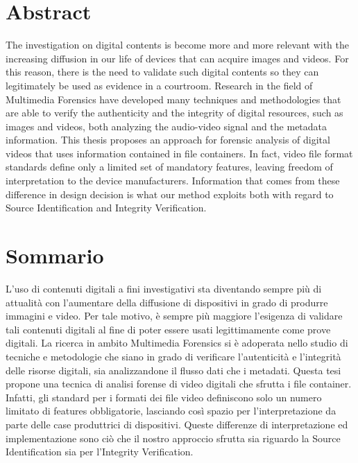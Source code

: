 \chapter*{Abstract}

The investigation on digital contents is become more and more relevant with the increasing diffusion in our life of devices that can acquire images and videos. For this reason, there is the need to validate such digital contents so they can legitimately be used as evidence in a courtroom.
Research in the field of Multimedia Forensics have developed many techniques and methodologies that are able to verify the authenticity and the integrity of digital resources, such as images and videos, both analyzing the audio-video signal and the metadata information.
This thesis proposes an approach for forensic analysis of digital videos that uses information contained in file containers. In fact, video file format standards define only a limited set of mandatory features, leaving freedom of interpretation to the device manufacturers.
Information that comes from these difference in design decision is what our method exploits both with regard to Source Identification and Integrity Verification.

\chapter*{Sommario}

L'uso di contenuti digitali a fini investigativi sta diventando sempre più di attualità con l'aumentare della diffusione di dispositivi in grado di produrre immagini e video. Per tale motivo, è sempre più maggiore l'esigenza di validare tali contenuti digitali al fine di poter essere usati legittimamente come prove digitali.
La ricerca in ambito Multimedia Forensics si è adoperata nello studio di tecniche e metodologie che siano in grado di verificare l'autenticità e l'integrità delle risorse digitali, sia analizzandone il flusso dati che i metadati. 
Questa tesi propone una tecnica di analisi forense di video digitali che sfrutta i file container. Infatti, gli standard per i formati dei file video definiscono solo un numero limitato di features obbligatorie, lasciando così spazio per l'interpretazione da parte delle case produttrici di dispositivi. Queste differenze di interpretazione ed implementazione sono ciò che il nostro approccio sfrutta sia riguardo la Source Identification sia per l'Integrity Verification.